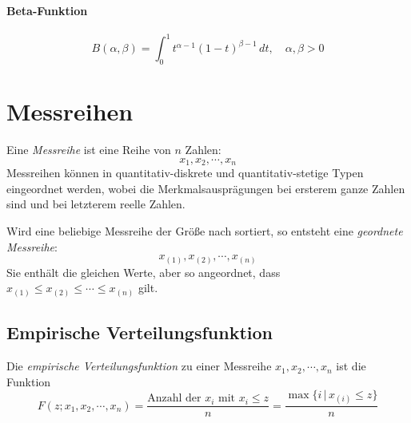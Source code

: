 \documentclass[a4paper, 11pt, accentcolor = tud3b]{tudreport}
\newcommand{\forwhich}{\ensuremath{{\,\vert\,}}}
\begin{document}
		    \paragraph{Beta-Funktion}
			    \begin{equation*}
				    B(\alpha, \beta) = \int_{0}^{1} \! t^{\alpha - 1} (1 - t) ^ { \beta - 1 } \, dt, \quad \alpha, \beta > 0
			    \end{equation*}
    
        \section{Messreihen}
            Eine \textit{Messreihe} ist eine Reihe von \(n\) Zahlen:
            \begin{equation*}
	            x_1, x_2, \cdots, x_n
            \end{equation*}
            Messreihen können in quantitativ-diskrete und quantitativ-stetige Typen eingeordnet werden, wobei die Merkmalsausprägungen bei ersterem ganze Zahlen sind und bei letzterem reelle Zahlen.
            
            Wird eine beliebige Messreihe der Größe nach sortiert, so entsteht eine \textit{geordnete Messreihe}:
            \begin{equation*}
	            x_{(1)}, x_{(2)}, \cdots, x_{(n)}
            \end{equation*}
            Sie enthält die gleichen Werte, aber so angeordnet, dass \( x_{(1)} \leq x_{(2)} \leq \cdots \leq x_{(n)} \) gilt.

			\subsection{Empirische Verteilungsfunktion}
				Die \textit{empirische Verteilungsfunktion} zu einer Messreihe \( x_1, x_2, \cdots, x_n \) ist die Funktion
				\begin{equation*}
					F(z; x_1, x_2, \cdots, x_n) = \frac{\textrm{Anzahl der } x_i \textrm{ mit } x_i \leq z}{n} = \frac{\max \{ i \forwhich x_{(i)} \leq z \} }{n}
				\end{equation*}
\end{document}
